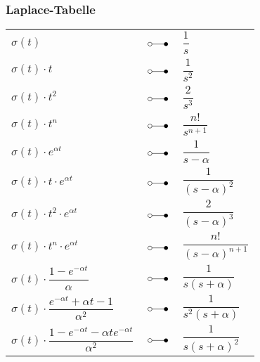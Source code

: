 \subsubsection{Laplace-Tabelle}
\renewcommand{\arraystretch}{2}
\begin{minipage}{0.465\textwidth}
	\begin{center}
		\begin{tabular}{p{4cm}p{0.75cm}p{3cm}}
			$\sigma \left( t \right)$ & $\; \laplace \;$ & $\dfrac{1}{s}$ \\
			
			$\sigma \left( t \right) \cdot t$ & $\; \laplace \;$ & $\dfrac{1}{s^2}$\\
			
			$\sigma \left( t \right) \cdot t^2$ & $\; \laplace \;$ & $\dfrac{2}{s^3}$\\
			
			$\sigma \left( t \right) \cdot t^n$ & $\; \laplace \;$ & $\dfrac{n!}{s^{n+1}}$\\
			
			$\sigma \left( t \right) \cdot e^{\alpha t}$ & $\; \laplace \;$ &
			$\dfrac{1}{s-\alpha}$\\
			
			$\sigma \left( t \right) \cdot t \cdot e^{\alpha t}$ & $\; \laplace \;$ & $\dfrac{1}{( s - \alpha )^2}$\\
			
			$\sigma \left( t \right)\cdot t^2 \cdot e^{\alpha t}$ &
			$\; \laplace \;$ & $\dfrac{2}{{( s - \alpha )}^3}$\\
			
			$\sigma \left( t \right)\cdot t^n \cdot e^{ \alpha t}$ &
			$\; \laplace \;$ & $\dfrac{n!}{(s-\alpha)^{n+1}}$\\
			
			$\sigma \left( t \right)\cdot \dfrac { 1 - e ^ { - \alpha t } } { \alpha }$ & $\; \laplace \;$ & $\dfrac { 1 } { s ( s + \alpha ) }$\\
			
			$\sigma \left( t \right)\cdot \dfrac {e ^ { - \alpha t }+\alpha t -1 } { \alpha^2 }$ & $\; \laplace \;$ & $\dfrac { 1 } { s^2 ( s + \alpha ) }$\\
			
			$\sigma \left( t \right)\cdot \dfrac {1- e ^ { - \alpha t } - \alpha t e ^ {- \alpha t }}{ \alpha ^2 }$ & $\; \laplace \;$ & $\dfrac { 1 } { s ( s + \alpha )^2 }$\\		
		\end{tabular}
	\end{center}
\end{minipage}
